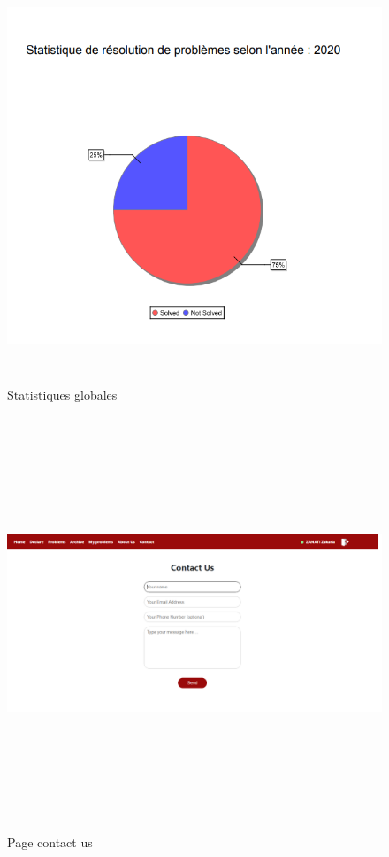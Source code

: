 \documentclass[11.5pt]{report}
\begin{document}
\newpage
\begin{figure}[h]
	
	\begin{center}
		\includegraphics[width=500pt,height=350pt]{sg.png} 
		\caption{Statistiques globales}
	\end{center}
	
\end{figure}
\newpage
\begin{figure}[h]
	
	\begin{center}
		\includegraphics[width=500pt,height=350pt]{contactus.png} 
		\caption{Page contact us}
	\end{center}
	
\end{figure}
\end{document}
